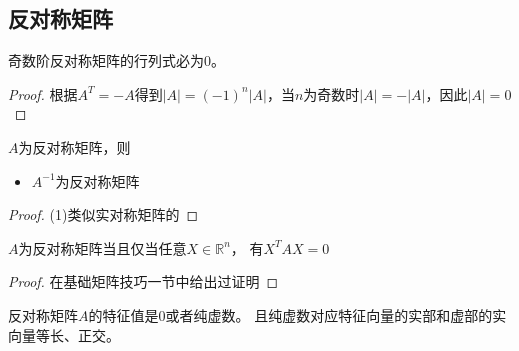 \subsection{反对称矩阵}


\begin{theorem}[反对称矩阵的行列式]
  奇数阶反对称矩阵的行列式必为$0$。
\end{theorem}

\begin{proof}
  根据$A^T = -A$得到$|A| = (-1)^n|A|$，当$n$为奇数时$|A| = -|A|$，因此$|A| = 0$
\end{proof}

\begin{theorem}[反对称矩阵的矩阵性质]
  $A$为反对称矩阵，则
  \begin{itemize}
  \item $A^{-1}$为反对称矩阵
  \end{itemize}
\end{theorem}

\begin{proof}
  (1)类似实对称矩阵的
\end{proof}

\begin{theorem}[反对称矩阵的二次型]
  $A$为反对称矩阵当且仅当任意$X \in \mathbb{R}^n$，
  有$X^TAX = 0$
\end{theorem}

\begin{proof}
  在基础矩阵技巧一节中给出过证明
\end{proof}

\begin{theorem}
  反对称矩阵$A$的特征值是$0$或者纯虚数。
  且纯虚数对应特征向量的实部和虚部的实向量等长、正交。
\end{theorem}

